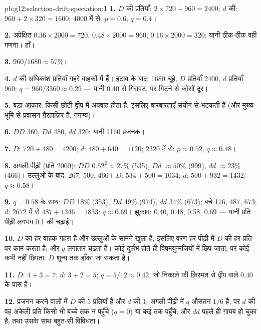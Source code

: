 \begin{solution}{pb:g12:selection-drift-speciation:1}
\textbf{1.} $D$ की प्रतियाँ: $2 \times 720 + 960 = 2400$; $d$ की: $960 +
2 \times 320 = 1600$; 4000 में से: $p = 0.6$, $q = 0.4$।

\textbf{2.} अपेक्षित $0.36 \times 2000 = 720$, $0.48 \times 2000 =
960$, $0.16 \times 2000 = 320$: यानी ठीक-ठीक वही गणना। हाँ।

\textbf{3.} $960/1680 \approx 57\%$।

\textbf{4.} $d$ की अधिकांश प्रतियाँ गहरे वाहकों में हैं। हटाव के बाद:
1680 चूहे, $D$ प्रतियाँ 2400, $d$ प्रतियाँ 960: $q = 960/3360 \approx
0.29$ --- यानी 0.40 से गिरावट, पर मिटने से कोसों दूर।

\textbf{5.} बड़ा आकार: किसी छोटी द्वीप  में अपवाह होता है, इसलिए
बारंबारताएँ संयोग से भटकती हैं (और मुख्य भूमि से प्रवासन ग़ैरहाज़िर है,
 नगण्य)।

\textbf{6.} $DD$ 360, $Dd$ 480, $dd$ 320: यानी 1160 प्रजनक।

\textbf{7.} $D$: $720 + 480 = 1200$; $d$: $480 + 640 = 1120$; 2320 में से:
$p \approx 0.52$, $q \approx 0.48$।

\textbf{8.} अगली पीढ़ी (प्रति 2000): $DD$ $0.52^2 \approx 27\%$
(535), $Dd$ $\approx 50\%$ (999), $dd$ $\approx 23\%$ (466)। उल्लुओं
के बाद: 267, 500, 466। $D$: $534 + 500 = 1034$; $d$: $500 + 932 =
1432$; $q \approx 0.58$।

\textbf{9.} $q = 0.58$ के साथ: $DD$ 18\% (353), $Dd$ 49\% (974), $dd$
34\% (673); बचे 176, 487, 673; $d$: 2672 में से $487 + 1346 = 1833$:
$q \approx 0.69$। झुकाव: 0.40, 0.48, 0.58, 0.69 --- यानी प्रति पीढ़ी
लगभग 0.1 की चढ़ाई।

\textbf{10.} $D$ का हर वाहक गहरा है और उल्लुओं के सामने खुला है, इसलिए वरण
हर पीढ़ी में $D$ की हर प्रति पर काम करता है; और $q$ लगातार चढ़ता है। कोई
  दुर्लभ होते ही विषमयुग्मजियों में छिप जाता, पर कोई
 कभी नहीं छिपता: $D$ शून्य तक हाँका जा सकता है।

\textbf{11.} $D$: $4 + 3 = 7$; $d$: $3 + 2 = 5$; $q = 5/12 \approx
0.42$, जो निकाले की क़िस्मत से द्वीप वाले 0.40 के पास है।

\textbf{12.} प्रजनन करने वालों में $D$ की 5 प्रतियाँ हैं और $d$ की 1:
अगली पीढ़ी में $q$ औसतन $1/6$ है, पर $d$ की वह अकेली प्रति किसी भी बच्चे
तक न पहुँचे ($q = 0$) या कई तक पहुँचे; और $dd$  पहले ही ग़ायब हो
चुका है, तथा उसके साथ बहुत-सी विविधता।


\end{solution}
